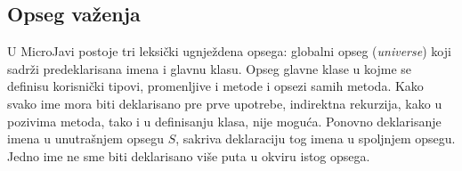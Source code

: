 \subsection*{Opseg važenja}

U MicroJavi postoje tri leksički ugnježdena opsega: globalni opseg (\textit{universe}) koji sadrži predeklarisana imena i glavnu klasu. 
Opseg glavne klase u kojme se definisu korisnički tipovi, promenljive i metode i opsezi samih metoda. 
Kako svako ime mora biti deklarisano pre prve upotrebe, indirektna rekurzija, kako u pozivima metoda, tako i u definisanju klasa, nije moguća. 
Ponovno deklarisanje imena u unutrašnjem opsegu $S$, sakriva deklaraciju tog imena u spoljnjem opsegu. 
Jedno ime ne sme biti deklarisano više puta u okviru istog opsega.

